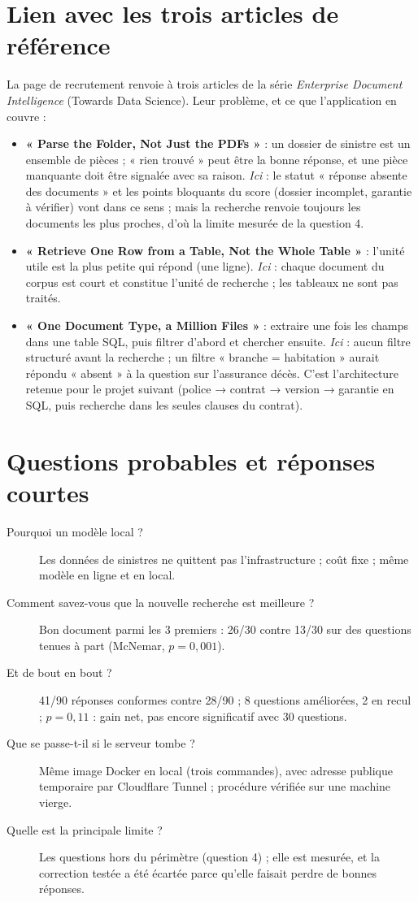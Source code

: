 \documentclass[11pt,a4paper]{article}
\begin{document}
\section{Lien avec les trois articles de référence}
La page de recrutement renvoie à trois articles de la série \emph{Enterprise Document Intelligence}
(Towards Data Science). Leur problème, et ce que l'application en couvre :
\begin{itemize}
\item \textbf{« Parse the Folder, Not Just the PDFs »} : un dossier de sinistre est un ensemble de
pièces ; « rien trouvé » peut être la bonne réponse, et une pièce manquante doit être signalée avec
sa raison. \emph{Ici} : le statut « réponse absente des documents » et les points bloquants du score
(dossier incomplet, garantie à vérifier) vont dans ce sens ; mais la recherche renvoie toujours les
documents les plus proches, d'où la limite mesurée de la question 4.
\item \textbf{« Retrieve One Row from a Table, Not the Whole Table »} : l'unité utile est la plus
petite qui répond (une ligne). \emph{Ici} : chaque document du corpus est court et constitue
l'unité de recherche ; les tableaux ne sont pas traités.
\item \textbf{« One Document Type, a Million Files »} : extraire une fois les champs dans une table
SQL, puis filtrer d'abord et chercher ensuite. \emph{Ici} : aucun filtre structuré avant la
recherche ; un filtre « branche = habitation » aurait répondu « absent » à la question sur
l'assurance décès. C'est l'architecture retenue pour le projet suivant (police → contrat →
version → garantie en SQL, puis recherche dans les seules clauses du contrat).
\end{itemize}

\section{Questions probables et réponses courtes}
\begin{description}
\item[Pourquoi un modèle local ?] Les données de sinistres ne quittent pas l'infrastructure ;
coût fixe ; même modèle en ligne et en local.
\item[Comment savez-vous que la nouvelle recherche est meilleure ?] Bon document parmi les 3
premiers : 26/30 contre 13/30 sur des questions tenues à part (McNemar, $p=0{,}001$).
\item[Et de bout en bout ?] 41/90 réponses conformes contre 28/90 ; 8 questions améliorées, 2 en
recul ; $p=0{,}11$ : gain net, pas encore significatif avec 30 questions.
\item[Que se passe-t-il si le serveur tombe ?] Même image Docker en local (trois commandes), avec
adresse publique temporaire par Cloudflare Tunnel ; procédure vérifiée sur une machine vierge.
\item[Quelle est la principale limite ?] Les questions hors du périmètre (question 4) ; elle est
mesurée, et la correction testée a été écartée parce qu'elle faisait perdre de bonnes réponses.
\end{description}
\end{document}
